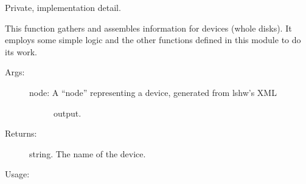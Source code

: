 \documentclass[letterpaper,10pt,english]{sphinxmanual}
\begin{document}
\begin{fulllineitems}
\label{\detokenize{linux:getdevinfo.linux.get_device_info}}
Private, implementation detail.

This function gathers and assembles information for devices (whole disks).
It employs some simple logic and the other functions defined in this
module to do its work.
\begin{description}
\item[{Args:}] \leavevmode\begin{description}
\item[{node:       A “node” representing a device, generated from lshw’s XML}] \leavevmode
output.

\end{description}

\item[{Returns:}] \leavevmode
string.     The name of the device.

\end{description}

Usage:

\begin{sphinxVerbatim}[commandchars=\\\{\}]
  
\end{sphinxVerbatim}

\end{fulllineitems}

\end{document}
